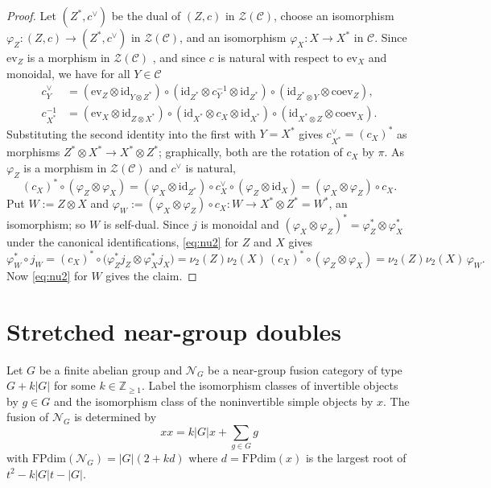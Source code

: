 \documentclass[10pt]{article}
\theoremstyle{plain}
\theoremstyle{definition}
\theoremstyle{plain}
\begin{document}
\begin{proof}
Let $(Z^\ast,c^\vee)$ be the dual of $(Z,c)$ in $\mathcal{Z}(\mathcal{C})$, choose an isomorphism $\varphi_Z\colon(Z,c)\to(Z^\ast,c^\vee)$ in $\mathcal{Z}(\mathcal{C})$, and an isomorphism $\varphi_X\colon X\to X^\ast$ in $\mathcal{C}$. Since $\mathrm{ev}_Z$ is a morphism in $\mathcal{Z}(\mathcal{C})$ \cite[Section 7.13]{MR3242743}, and since $c$ is natural with respect to $\mathrm{ev}_X$ and monoidal, we have for all $Y\in\mathcal{C}$
\begin{align*}
c^\vee_Y&=(\mathrm{ev}_Z\otimes\mathrm{id}_{Y\otimes Z^\ast})\circ(\mathrm{id}_{Z^\ast}\otimes c_Y^{-1}\otimes\mathrm{id}_{Z^\ast})\circ(\mathrm{id}_{Z^\ast\otimes Y}\otimes\mathrm{coev}_Z),\\
c_{X^\ast}^{-1}&=(\mathrm{ev}_X\otimes\mathrm{id}_{Z\otimes X^\ast})\circ(\mathrm{id}_{X^\ast}\otimes c_X\otimes\mathrm{id}_{X^\ast})\circ(\mathrm{id}_{X^\ast\otimes Z}\otimes\mathrm{coev}_X).
\end{align*}
Substituting the second identity into the first with $Y=X^\ast$ gives $c^\vee_{X^\ast}=(c_X)^\ast$ as morphisms $Z^\ast\otimes X^\ast\to X^\ast\otimes Z^\ast$; graphically, both are the rotation of $c_X$ by $\pi$. As $\varphi_Z$ is a morphism in $\mathcal{Z}(\mathcal{C})$ and $c^\vee$ is natural,
\[
(c_X)^\ast\circ(\varphi_Z\otimes\varphi_X)=(\varphi_X\otimes\mathrm{id}_{Z^\ast})\circ c^\vee_X\circ(\varphi_Z\otimes\mathrm{id}_X)=(\varphi_X\otimes\varphi_Z)\circ c_X.
\]
Put $W:=Z\otimes X$ and $\varphi_W:=(\varphi_X\otimes\varphi_Z)\circ c_X\colon W\to X^\ast\otimes Z^\ast=W^\ast$, an isomorphism; so $W$ is self-dual. Since $j$ is monoidal and $(\varphi_X\otimes\varphi_Z)^\ast=\varphi_Z^\ast\otimes\varphi_X^\ast$ under the canonical identifications, \eqref{eq:nu2} for $Z$ and $X$ gives
\[
\varphi_W^\ast\circ j_W=(c_X)^\ast\circ\bigl(\varphi_Z^\ast j_Z\otimes\varphi_X^\ast j_X\bigr)=\nu_2(Z)\nu_2(X)\,(c_X)^\ast\circ(\varphi_Z\otimes\varphi_X)=\nu_2(Z)\nu_2(X)\,\varphi_W .
\]
Now \eqref{eq:nu2} for $W$ gives the claim.
\end{proof}


\section{Stretched near-group doubles}\label{sec:neargroup}

Let $G$ be a finite abelian group and $\mathcal{N}_G$ be a near-group fusion category of type $G+k|G|$ for some $k\in\mathbb{Z}_{\geq1}$. Label the isomorphism classes of invertible objects by $g\in G$ and the isomorphism class of the noninvertible simple objects by $x$. The fusion of $\mathcal{N}_G$ is determined by
\begin{equation}
    xx=k|G|x+\sum_{g\in G}g
\end{equation}
with $\mathrm{FPdim}(\mathcal{N}_G)=|G|(2+kd)$ where $d=\mathrm{FPdim}(x)$ is the largest root of $t^2-k|G|t-|G|$.
\end{document}
